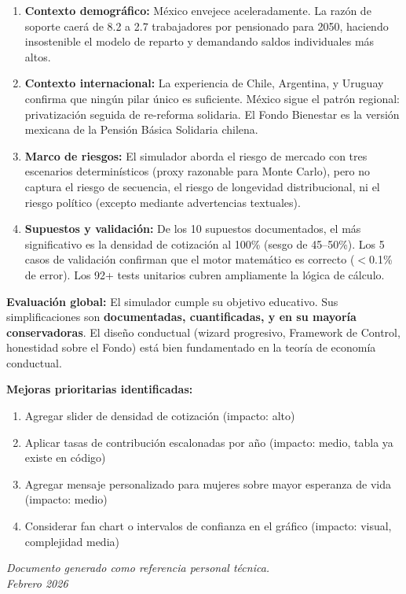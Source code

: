 \documentclass[11pt,a4paper]{report}
\begin{document}
\begin{enumerate}
  \item \textbf{Contexto demogr\'afico:} M\'exico envejece aceleradamente. La raz\'on de soporte caer\'a de 8.2 a 2.7 trabajadores por pensionado para 2050, haciendo insostenible el modelo de reparto y demandando saldos individuales m\'as altos.

  \item \textbf{Contexto internacional:} La experiencia de Chile, Argentina, y Uruguay confirma que ning\'un pilar \'unico es suficiente. M\'exico sigue el patr\'on regional: privatizaci\'on seguida de re-reforma solidaria. El Fondo Bienestar es la versi\'on mexicana de la Pensi\'on B\'asica Solidaria chilena.

  \item \textbf{Marco de riesgos:} El simulador aborda el riesgo de mercado con tres escenarios determin\'isticos (proxy razonable para Monte Carlo), pero no captura el riesgo de secuencia, el riesgo de longevidad distribucional, ni el riesgo pol\'itico (excepto mediante advertencias textuales).

  \item \textbf{Supuestos y validaci\'on:} De los 10 supuestos documentados, el m\'as significativo es la densidad de cotizaci\'on al 100\% (sesgo de 45--50\%). Los 5 casos de validaci\'on confirman que el motor matem\'atico es correcto ($<$0.1\% de error). Los 92+ tests unitarios cubren ampliamente la l\'ogica de c\'alculo.
\end{enumerate}

\textbf{Evaluaci\'on global:} El simulador cumple su objetivo educativo. Sus simplificaciones son \textbf{documentadas, cuantificadas, y en su mayor\'ia conservadoras}. El dise\~no conductual (wizard progresivo, Framework de Control, honestidad sobre el Fondo) est\'a bien fundamentado en la teor\'ia de econom\'ia conductual.

\textbf{Mejoras prioritarias identificadas:}
\begin{enumerate}
  \item Agregar slider de densidad de cotizaci\'on (impacto: alto)
  \item Aplicar tasas de contribuci\'on escalonadas por a\~no (impacto: medio, tabla ya existe en c\'odigo)
  \item Agregar mensaje personalizado para mujeres sobre mayor esperanza de vida (impacto: medio)
  \item Considerar fan chart o intervalos de confianza en el gr\'afico (impacto: visual, complejidad media)
\end{enumerate}

\vfill
\begin{center}
\textit{Documento generado como referencia personal t\'ecnica.} \\
\textit{Febrero 2026}
\end{center}
\end{document}
